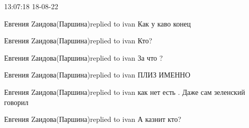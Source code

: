  
 
 
 
 

13:07:18 18-08-22

Евгения Zаидова(Паршина)replied to ivan
Как у каво конец

Евгения Zаидова(Паршина)replied to ivan
Кто?

Евгения Zаидова(Паршина)replied to ivan
За что ?

Евгения Zаидова(Паршина)replied to ivan
ПЛИЗ ИМЕННО

Евгения Zаидова(Паршина)replied to ivan
как нет есть . Даже сам зеленский говорил

Евгения Zаидова(Паршина)replied to ivan
А казнит кто?

